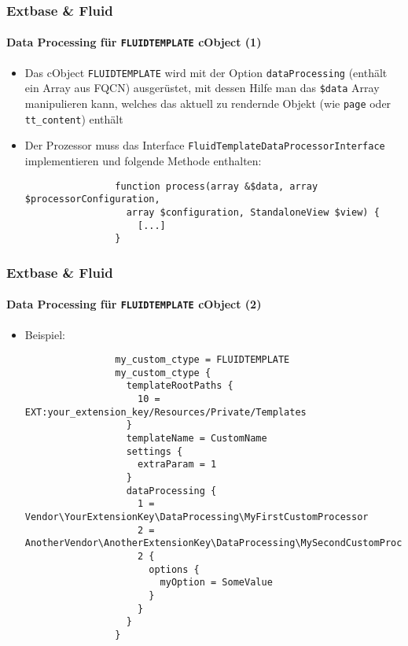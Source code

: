 \begin{frame}[fragile]
	\frametitle{Extbase \& Fluid}
	\framesubtitle{Data Processing für \texttt{FLUIDTEMPLATE} cObject (1)}

	\lstset{basicstyle=\smaller\ttfamily}

	\begin{itemize}

		\item Das cObject \texttt{FLUIDTEMPLATE} wird mit der Option
			\texttt{dataProcessing} (enthält ein Array aus FQCN) ausgerüstet,
			mit dessen Hilfe man das \texttt{\$data} Array manipulieren kann,
			welches das aktuell zu rendernde Objekt (wie \texttt{page} oder
			\texttt{tt\_content}) enthält

		\item Der Prozessor muss das Interface
			\texttt{FluidTemplateDataProcessorInterface} implementieren und
			folgende Methode enthalten:

			\begin{lstlisting}
				function process(array &$data, array $processorConfiguration,
				  array $configuration, StandaloneView $view) {
				    [...]
				}
			\end{lstlisting}

	\end{itemize}

\end{frame}


\begin{frame}[fragile]
	\frametitle{Extbase \& Fluid}
	\framesubtitle{Data Processing für \texttt{FLUIDTEMPLATE} cObject (2)}

	\lstset{basicstyle=\tiny\ttfamily}

	\begin{itemize}

		\item Beispiel:

			\begin{lstlisting}
				my_custom_ctype = FLUIDTEMPLATE
				my_custom_ctype {
				  templateRootPaths {
				    10 = EXT:your_extension_key/Resources/Private/Templates
				  }
				  templateName = CustomName
				  settings {
				    extraParam = 1
				  }
				  dataProcessing {
				    1 = Vendor\YourExtensionKey\DataProcessing\MyFirstCustomProcessor
				    2 = AnotherVendor\AnotherExtensionKey\DataProcessing\MySecondCustomProcessor
				    2 {
				      options {
				        myOption = SomeValue
				      }
				    }
				  }
				}
			\end{lstlisting}

	\end{itemize}

\end{frame}

